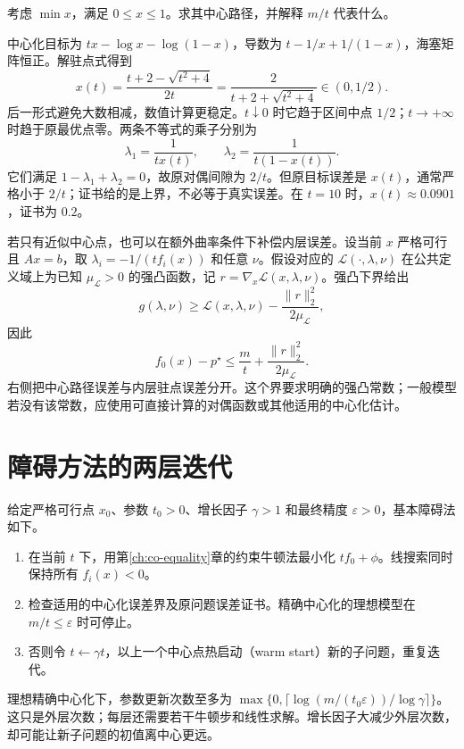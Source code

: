 \documentclass[UTF8,12pt,a4paper,fontset=fandol]{ctexbook}
\begin{document}
\begin{example}[区间上的中心点与误差证书]
考虑 $\min x$，满足 $0\leq x\leq1$。求其中心路径，并解释 $m/t$ 代表什么。
\end{example}
\begin{solve}
中心化目标为 $tx-\log x-\log(1-x)$，导数为 $t-1/x+1/(1-x)$，海塞矩阵恒正。解驻点式得到
\[
 x(t)=\frac{t+2-\sqrt{t^2+4}}{2t}
     =\frac{2}{t+2+\sqrt{t^2+4}}\in(0,1/2).
\]
后一形式避免大数相减，数值计算更稳定。$t\downarrow0$ 时它趋于区间中点 $1/2$；$t\to+\infty$ 时趋于原最优点零。两条不等式的乘子分别为
\[
 \lambda_1=\frac1{tx(t)},\qquad
 \lambda_2=\frac1{t(1-x(t))}.
\]
它们满足 $1-\lambda_1+\lambda_2=0$，故原对偶间隙为 $2/t$。但原目标误差是 $x(t)$，通常严格小于 $2/t$；证书给的是上界，不必等于真实误差。在 $t=10$ 时，$x(t)\approx0.0901$，证书为 $0.2$。
\end{solve}

若只有近似中心点，也可以在额外曲率条件下补偿内层误差。设当前 $x$ 严格可行且 $Ax=b$，取 $\lambda_i=-1/(tf_i(x))$ 和任意 $\nu$。假设对应的 $\mathcal L(\cdot,\lambda,\nu)$ 在公共定义域上为已知 $\mu_{\mathcal L}>0$ 的强凸函数，记 $r=\nabla_x\mathcal L(x,\lambda,\nu)$。强凸下界给出
\[
 g(\lambda,\nu)\geq
 \mathcal L(x,\lambda,\nu)-\frac{\|r\|_2^2}{2\mu_{\mathcal L}},
\]
因此
\begin{equation}
 f_0(x)-p^\star
 \leq\frac mt+\frac{\|r\|_2^2}{2\mu_{\mathcal L}}.
 \label{eq:co-inexact-center-bound}
\end{equation}
右侧把中心路径误差与内层驻点误差分开。这个界要求明确的强凸常数；一般模型若没有该常数，应使用可直接计算的对偶函数或其他适用的中心化估计。

\section{障碍方法的两层迭代}

给定严格可行点 $x_0$、参数 $t_0>0$、增长因子 $\gamma>1$ 和最终精度 $\varepsilon>0$，基本障碍法如下。
\begin{enumerate}
 \item 在当前 $t$ 下，用第\ref{ch:co-equality}章的约束牛顿法最小化 $tf_0+\phi$。线搜索同时保持所有 $f_i(x)<0$。
 \item 检查适用的中心化误差界及原问题误差证书。精确中心化的理想模型在 $m/t\leq\varepsilon$ 时可停止。
 \item 否则令 $t\leftarrow\gamma t$，以上一个中心点热启动（warm start）新的子问题，重复迭代。
\end{enumerate}
理想精确中心化下，参数更新次数至多为 $\max\{0,\lceil\log(m/(t_0\varepsilon))/\log\gamma\rceil\}$。这只是外层次数；每层还需要若干牛顿步和线性求解。增长因子大减少外层次数，却可能让新子问题的初值离中心更远。
\end{document}
